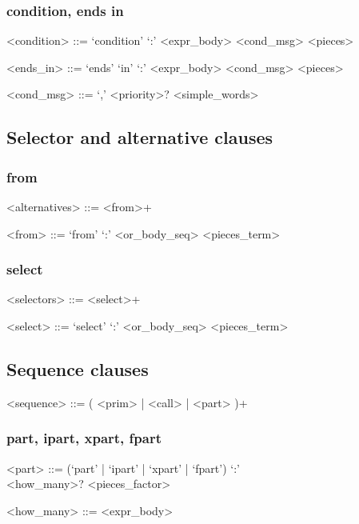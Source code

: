 \documentclass[12pt]{article}
\begin{document}
\subsubsection{condition, ends in}
\begin{grammar}
<condition> ::= `condition' `:' <expr_body> <cond_msg> <pieces>

<ends_in> ::= `ends' `in' `:' <expr_body> <cond_msg> <pieces>

<cond_msg> ::= `,' <priority>? <simple_words>
\end{grammar}

\subsection{Selector and alternative clauses}
\subsubsection{from}
\begin{grammar}
<alternatives> ::= <from>+

<from> ::= `from' `:' <or_body_seq> <pieces_term>
\end{grammar}

\subsubsection{select}
\begin{grammar}
<selectors> ::= <select>+

<select> ::= `select' `:' <or_body_seq> <pieces_term>
\end{grammar}

\subsection{Sequence clauses}
\begin{grammar}
<sequence> ::= ( <prim> | <call> | <part> )+
\end{grammar}

\subsubsection{part, ipart, xpart, fpart}
\begin{grammar}
<part> ::= (`part' | `ipart' | `xpart' | `fpart') `:' \\ <how_many>? <pieces_factor>

<how_many> ::= <expr_body>
\end{grammar}
\end{document}
